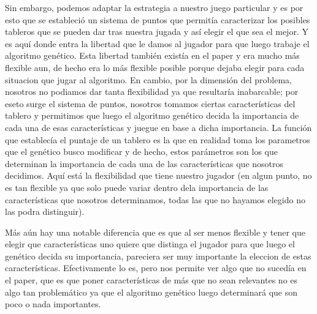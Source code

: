 \documentclass[A4paper,oneside,fleqn,11pt]{article}
\theoremstyle{definition}
\begin{document}
Sin embargo, podemos adaptar la estrategia a nuestro juego particular y es por esto que se estableció un sistema de puntos que permitía caracterizar los posibles tableros que se pueden dar tras nuestra jugada y así elegir el que sea el mejor. Y es aquí donde entra la libertad que le damos al jugador para que luego trabaje el algoritmo genético. Esta libertad también existía en el paper y era mucho más flexible aun, de hecho era lo más flexible posible porque dejaba elegir para cada situacion que jugar al algoritmo. En cambio, por la dimensión del problema,  nosotros no podiamos dar tanta flexibilidad ya que resultaría inabarcable; por eseto surge el sistema de puntos, nosotros tomamos ciertas características del tablero y permitimos que luego el algoritmo genético decida la importancia de cada una de esas características y juegue en base a dicha importancia. La función que establecía el puntaje de un tablero es la que en realidad toma los parametros que el genético busco modificar y de hecho, estos parámetros son los que determinan la importancia de cada una de las características que nosotros decidimos. Aquí está la flexibilidad que tiene nuestro jugador (en algun punto, no es tan flexible ya que solo puede variar dentro dela importancia de las características que nosotros determinamos, todas las que no hayamos elegido no las podra distinguir).

Más aún hay una notable diferencia que es que al ser menos flexible y tener que elegir que características uno quiere que distinga el jugador para que luego el genético decida su importancia, pareciera ser muy importante la eleccion de estas características. Efectivamente lo es, pero nos permite ver algo que no sucedía en el paper, que es que poner características de más que no sean relevantes no es algo tan problemático ya que el algoritmo genético luego determinará que son poco o nada importantes. 
\end{document}
